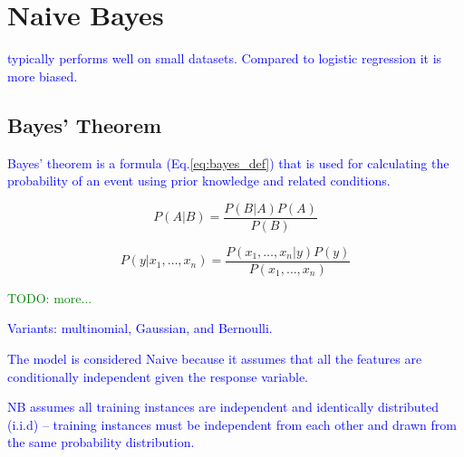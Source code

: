 \section{Naive Bayes}

\textcolor{blue}{typically performs well on small datasets. Compared to logistic regression it is more biased.}

\subsection{Bayes' Theorem}

\textcolor{blue}{Bayes' theorem is a formula (Eq.\ref{eq:bayes_def}) that is used for calculating the probability of an event using prior knowledge and related conditions.}

\begin{equation}
{P(A|B)=\frac{P(B|A)P(A)}{P(B)}}
\label{eq:bayes_def}
\end{equation}

\begin{equation}
{P(y|x_1,\dots,x_n)=\frac{P(x_1,\dots,x_n|y)P(y)}{P(x_1,\dots,x_n)}}
\label{eq:bayes_exp_def}
\end{equation}

\textcolor{green}{TODO: more...}

\textcolor{blue}{Variants: multinomial, Gaussian, and Bernoulli.}

\textcolor{blue}{The model is considered Naive because it assumes that all the features are conditionally independent given the response variable.}

\textcolor{blue}{NB assumes all training instances are {independent and identically distributed (i.i.d)} -- training instances must be independent from each other and drawn from the same probability distribution.}